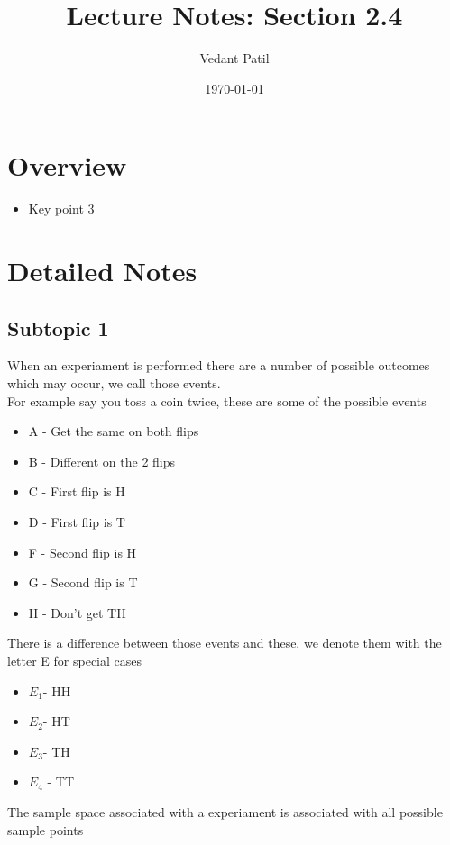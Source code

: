 \documentclass[12pt,a4paper]{article}
\title{Lecture Notes: Section 2.4}
\author{Vedant Patil}
\date{\today}
\begin{document}
\maketitle

\section{Overview}
\begin{tcolorbox}[colback=yellow!10!white,colframe=yellow!50!black,title=Key Points]
  \begin{itemize}
    \item Key point 3
  \end{itemize}
\end{tcolorbox}

\section{Detailed Notes}
\subsection{Subtopic 1}
When an experiament is performed there are a number of possible outcomes which may occur, we call those events.  \\ 
For example say you toss a coin twice, these are some of the possible events 
\begin{itemize}
  \item A - Get the same on both flips 
  \item B - Different on the 2 flips 
  \item C - First flip is H 
  \item D - First flip is T 
  \item F - Second flip is H 
  \item G - Second flip is T 
  \item H - Don't get TH 
\end{itemize}
There is a difference between those events and these, we denote them with the letter E for special cases  \\
\begin{itemize}
  \item \( E_{1} \)- HH 
  \item \( E_{2} \)- HT 
  \item \( E_{3} \)- TH 
  \item \( E_{4} \) - TT 
\end{itemize}

The sample space associated with a experiament is associated with all possible sample points \\ 
\end{document}
